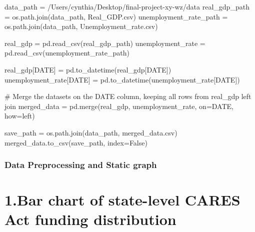 \documentclass[
  letterpaper,
  DIV=11,
  numbers=noendperiod]{scrartcl}
\newenvironment{Shaded}{\begin{snugshade}}{\end{snugshade}}
\newcommand{\CommentTok}[1]{\textcolor[rgb]{0.37,0.37,0.37}{#1}}
\newcommand{\NormalTok}[1]{\textcolor[rgb]{0.00,0.23,0.31}{#1}}
\newcommand{\OperatorTok}[1]{\textcolor[rgb]{0.37,0.37,0.37}{#1}}
\newcommand{\StringTok}[1]{\textcolor[rgb]{0.13,0.47,0.30}{#1}}
\newcommand{\VariableTok}[1]{\textcolor[rgb]{0.07,0.07,0.07}{#1}}
\begin{document}
\begin{Shaded}
\begin{Highlighting}[]
\NormalTok{data\_path }\OperatorTok{=} \StringTok{\textquotesingle{}/Users/cynthia/Desktop/final{-}project{-}xy{-}wz/data\textquotesingle{}}
\NormalTok{real\_gdp\_path }\OperatorTok{=}\NormalTok{ os.path.join(data\_path, }\StringTok{\textquotesingle{}Real\_GDP.csv\textquotesingle{}}\NormalTok{)}
\NormalTok{unemployment\_rate\_path }\OperatorTok{=}\NormalTok{ os.path.join(data\_path, }\StringTok{\textquotesingle{}Unemployment\_rate.csv\textquotesingle{}}\NormalTok{)}

\NormalTok{real\_gdp }\OperatorTok{=}\NormalTok{ pd.read\_csv(real\_gdp\_path)}
\NormalTok{unemployment\_rate }\OperatorTok{=}\NormalTok{ pd.read\_csv(unemployment\_rate\_path)}

\NormalTok{real\_gdp[}\StringTok{\textquotesingle{}DATE\textquotesingle{}}\NormalTok{] }\OperatorTok{=}\NormalTok{ pd.to\_datetime(real\_gdp[}\StringTok{\textquotesingle{}DATE\textquotesingle{}}\NormalTok{])}
\NormalTok{unemployment\_rate[}\StringTok{\textquotesingle{}DATE\textquotesingle{}}\NormalTok{] }\OperatorTok{=}\NormalTok{ pd.to\_datetime(unemployment\_rate[}\StringTok{\textquotesingle{}DATE\textquotesingle{}}\NormalTok{])}

\CommentTok{\# Merge the datasets on the DATE column, keeping all rows from real\_gdp left join}
\NormalTok{merged\_data }\OperatorTok{=}\NormalTok{ pd.merge(real\_gdp, unemployment\_rate, on}\OperatorTok{=}\StringTok{\textquotesingle{}DATE\textquotesingle{}}\NormalTok{, how}\OperatorTok{=}\StringTok{\textquotesingle{}left\textquotesingle{}}\NormalTok{)}

\NormalTok{save\_path }\OperatorTok{=}\NormalTok{ os.path.join(data\_path, }\StringTok{\textquotesingle{}merged\_data.csv\textquotesingle{}}\NormalTok{)}
\NormalTok{merged\_data.to\_csv(save\_path, index}\OperatorTok{=}\VariableTok{False}\NormalTok{)}
\end{Highlighting}
\end{Shaded}

\subsubsection{Data Preprocessing and Static
graph}\label{data-preprocessing-and-static-graph}

\section{1.Bar chart of state-level CARES Act funding
distribution}\label{bar-chart-of-state-level-cares-act-funding-distribution}
\end{document}

